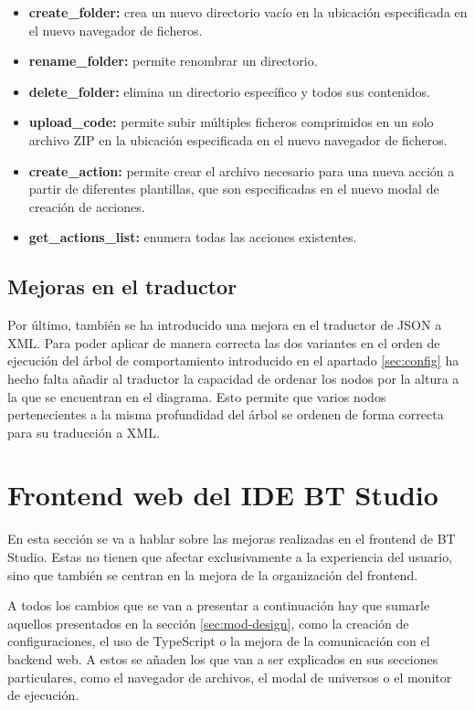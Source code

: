 \begin{itemize}
    \item \textbf{create\_folder:} crea un nuevo directorio vacío en la ubicación especificada en el nuevo navegador de ficheros.
    \item \textbf{rename\_folder:} permite renombrar un directorio.
    \item \textbf{delete\_folder:} elimina un directorio específico y todos sus contenidos.
    \item \textbf{upload\_code:} permite subir múltiples ficheros comprimidos en un solo archivo ZIP en la ubicación especificada en el nuevo navegador de ficheros.
    \item \textbf{create\_action:} permite crear el archivo necesario para una nueva acción a partir de diferentes plantillas, que son especificadas en el nuevo modal de creación de acciones.
    \item \textbf{get\_actions\_list:} enumera todas las acciones existentes.
\end{itemize}

\subsection{Mejoras en el traductor}

Por último, también se ha introducido una mejora en el traductor de JSON a XML. Para poder aplicar de manera correcta las dos variantes en el orden de ejecución del árbol de comportamiento introducido en el apartado \ref{sec:config} ha hecho falta añadir al traductor la capacidad de ordenar los nodos por la altura a la que se encuentran en el diagrama. Esto permite que varios nodos pertenecientes a la misma profundidad del árbol se ordenen de forma correcta para su traducción a XML.

\section{Frontend web del IDE BT Studio}\label{sec:bt-frontend}

En esta sección se va a hablar sobre las mejoras realizadas en el frontend de BT Studio. Estas no tienen que afectar exclusivamente a la experiencia del usuario, sino que también se centran en la mejora de la organización del frontend.

A todos los cambios que se van a presentar a continuación hay que sumarle aquellos presentados en la sección \ref{sec:mod-design}, como la creación de configuraciones, el uso de TypeScript o la mejora de la comunicación con el backend web. A estos se añaden los que van a ser explicados en sus secciones particulares, como el navegador de archivos, el modal de universos o el monitor de ejecución.

